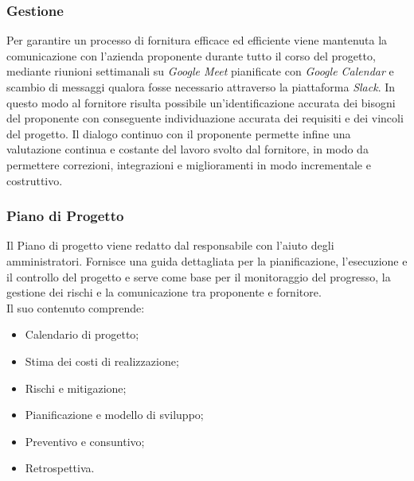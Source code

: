 \documentclass[10pt, a4paper]{article}
\begin{document}
\subsubsection{Gestione}
Per garantire un processo di fornitura efficace ed efficiente viene mantenuta la comunicazione con l'azienda proponente durante tutto il corso del progetto, mediante riunioni settimanali su \textit{Google Meet} pianificate con \textit{Google Calendar} e scambio di messaggi qualora fosse necessario attraverso la piattaforma \textit{Slack}. In questo modo al fornitore risulta possibile un'identificazione accurata dei bisogni del proponente con conseguente individuazione accurata dei requisiti e dei vincoli del progetto. Il dialogo continuo con il proponente permette infine una valutazione continua e costante del lavoro svolto dal fornitore, in modo da permettere correzioni, integrazioni e miglioramenti in modo incrementale e costruttivo.  
\subsubsection{Piano di Progetto}
Il Piano di progetto viene redatto dal responsabile con l'aiuto degli amministratori. Fornisce una guida dettagliata per la pianificazione, l'esecuzione e il controllo del progetto e serve come base per il monitoraggio del progresso, la gestione dei rischi e la comunicazione tra proponente e fornitore.\\ Il suo contenuto comprende:
\begin{itemize}
    \item Calendario di progetto;
    \item Stima dei costi di realizzazione;
    \item Rischi e mitigazione;
    \item Pianificazione e modello di sviluppo;
    \item Preventivo e consuntivo;
    \item Retrospettiva.
\end{itemize}
\end{document}
